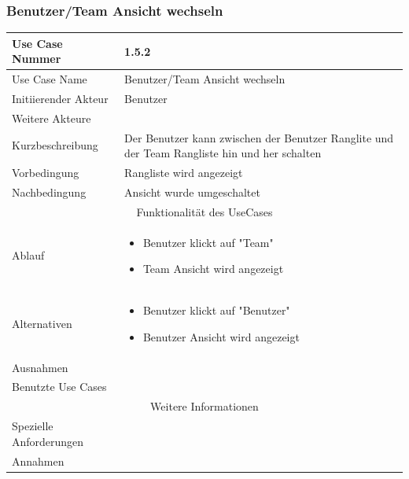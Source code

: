 \documentclass[10pt,a4paper]{article}
\begin{document}
\subsubsection{Benutzer/Team Ansicht wechseln}
	\begin{tabular}{|l|p{.5\linewidth}|}
	\hline Use Case Nummer & 1.5.2 \\ 
	\hline Use Case Name & Benutzer/Team Ansicht wechseln \\ 
	\hline Initiierender Akteur & Benutzer \\
	\hline Weitere Akteure &  \\
	\hline Kurzbeschreibung & Der Benutzer kann zwischen der Benutzer Ranglite und der Team Rangliste hin und her schalten \\
	\hline Vorbedingung & Rangliste wird angezeigt \\
	\hline Nachbedingung & Ansicht wurde umgeschaltet \\
	\hline \multicolumn{2}{|c|}{Funktionalität des UseCases}\\
	\hline Ablauf & \begin{itemize}
		\item Benutzer klickt auf "Team"
		\item Team Ansicht wird angezeigt
	\end{itemize} \\
	\hline Alternativen & \begin{itemize}
				\item Benutzer klickt auf "Benutzer"
				\item Benutzer Ansicht wird angezeigt
			\end{itemize} \\
	\hline Ausnahmen &  \\
	\hline Benutzte Use Cases &  \\
	\hline \multicolumn{2}{|c|}{Weitere Informationen} \\
	\hline Spezielle Anforderungen &  \\
	\hline Annahmen &  \\
	\hline
	\end{tabular}
		
\end{document}

